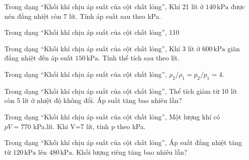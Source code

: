 \begin{ex}
Trong dạng “Khối khí chịu áp suất của cột chất lỏng”, Khí 21 lít ở $140\,\text{kPa}$ được nén đẳng nhiệt còn 7 lít. Tính áp suất sau theo kPa.
\end{ex}

\begin{bt}
Trong dạng “Khối khí chịu áp suất của cột chất lỏng”, 110
\end{bt}

\begin{ex}
Trong dạng “Khối khí chịu áp suất của cột chất lỏng”, Khí 3 lít ở $600\,\text{kPa}$ giãn đẳng nhiệt đến áp suất $150\,\text{kPa}$. Tính thể tích sau theo lít.
\end{ex}

\begin{bt}
Trong dạng “Khối khí chịu áp suất của cột chất lỏng”, $\rho_2/\rho_1=p_2/p_1=4$.
\end{bt}

\begin{ex}
Trong dạng “Khối khí chịu áp suất của cột chất lỏng”, Thể tích giảm từ 10 lít còn 5 lít ở nhiệt độ không đổi. Áp suất tăng bao nhiêu lần?
\end{ex}

\begin{ex}
Trong dạng “Khối khí chịu áp suất của cột chất lỏng”, Một lượng khí có $pV=770$ kPa.lít. Khi V=7 lít, tính p theo kPa.
\end{ex}

\begin{ex}
Trong dạng “Khối khí chịu áp suất của cột chất lỏng”, Áp suất đẳng nhiệt tăng từ $120\,\text{kPa}$ lên $480\,\text{kPa}$. Khối lượng riêng tăng bao nhiêu lần?
\end{ex}

